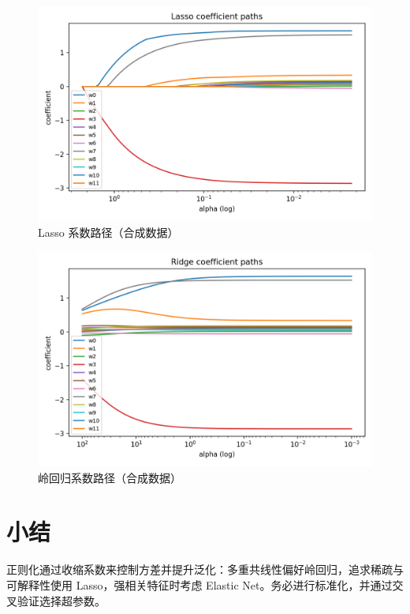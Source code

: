 \documentclass[UTF8,zihao=-4]{ctexart}
\begin{document}
\begin{figure}[H]
  \centering
  \includegraphics[width=0.85\linewidth]{lasso_path.png}
  \caption{Lasso 系数路径（合成数据）}
  \label{fig:lasso_path}
\end{figure}

\begin{figure}[H]
  \centering
  \includegraphics[width=0.85\linewidth]{ridge_path.png}
  \caption{岭回归系数路径（合成数据）}
  \label{fig:ridge_path}
\end{figure}

\FloatBarrier %

\section{小结}
正则化通过收缩系数来控制方差并提升泛化：多重共线性偏好岭回归，追求稀疏与可解释性使用 Lasso，强相关特征时考虑 Elastic Net。务必进行标准化，并通过交叉验证选择超参数。
\end{document}

